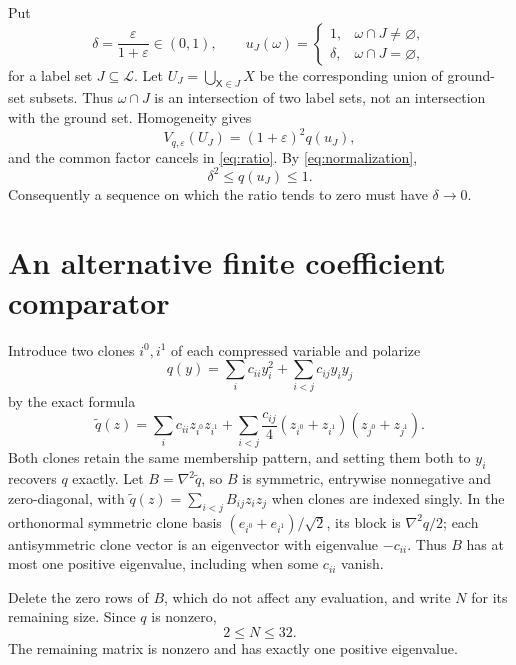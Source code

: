\documentclass[11pt]{article}
\theoremstyle{remark}
\begin{document}
Put
\[
 \delta=\frac{\varepsilon}{1+\varepsilon}\in(0,1),\qquad
 u_J(\omega)=
 \begin{cases}
 1,&\omega\cap J\neq\varnothing,\\
 \delta,&\omega\cap J=\varnothing,
 \end{cases}
\]
for a label set $J\subseteq\mathcal L$.  Let
$U_J=\bigcup_{\mathsf X\in J}X$ be the corresponding union of ground-set
subsets.  Thus $\omega\cap J$ is an intersection of two label sets, not an
intersection with the ground set.  Homogeneity gives
\[
 V_{q,\varepsilon}(U_J)=(1+\varepsilon)^2q(u_J),
\]
and the common factor cancels in \eqref{eq:ratio}.  By
\eqref{eq:normalization},
\begin{equation}
 \delta^2\leq q(u_J)\leq 1.
 \label{eq:delta-bounds}
\end{equation}
Consequently a sequence on which the ratio tends to zero must have
$\delta\to0$.

\section{An alternative finite coefficient comparator}
\label{sec:comparator}

Introduce two clones $i^0,i^1$ of each compressed variable and polarize
\[
 q(y)=\sum_i c_{ii}y_i^2+\sum_{i<j}c_{ij}y_iy_j
\]
by the exact formula
\begin{equation}
 \widetilde q(z)=\sum_i c_{ii}z_{i^0}z_{i^1}
 +\sum_{i<j}\frac{c_{ij}}4
       (z_{i^0}+z_{i^1})(z_{j^0}+z_{j^1}).
 \label{eq:polarization}
\end{equation}
Both clones retain the same membership pattern, and setting them both to
$y_i$ recovers $q$ exactly.  Let $B=\nabla^2\widetilde q$, so $B$ is symmetric,
entrywise nonnegative and zero-diagonal, with
$\widetilde q(z)=\sum_{i<j}B_{ij}z_iz_j$ when clones are indexed singly.
In the orthonormal symmetric clone basis
$(e_{i^0}+e_{i^1})/\sqrt2$, its block is $\nabla^2q/2$; each antisymmetric
clone vector is an eigenvector with eigenvalue $-c_{ii}$.  Thus $B$ has at
most one positive eigenvalue, including when some $c_{ii}$ vanish.

Delete the zero rows of $B$, which do not affect any evaluation, and write
$N$ for its remaining size.  Since $q$ is nonzero,
\begin{equation}
 2\leq N\leq32.
 \label{eq:clone-count}
\end{equation}
The remaining matrix is nonzero and has exactly one positive eigenvalue.
\end{document}

